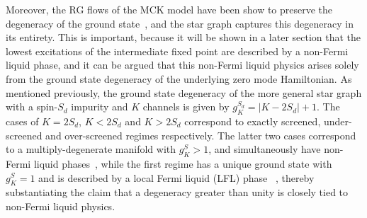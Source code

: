 \documentclass{iopart}
\begin{document}
Moreover, the RG flows of the MCK model have been show to {preserve the degeneracy of the ground state}~\cite{pang_cox_1991,kroha_kolf_2007,zitko_fabrizio_2017}, and the star graph captures this degeneracy in its entirety.
This is important, because it will be shown in a later section that the lowest excitations of the intermediate fixed point are described by a non-Fermi liquid phase, and it can be argued that this non-Fermi liquid physics arises solely from the ground state degeneracy of the underlying zero mode Hamiltonian. As mentioned previously, the ground state degeneracy of the more general star graph with a spin-\({S_d}\) impurity and \(K\) channels is given by \(g^{S_d}_K = |K - 2{S_d}|+1\).
The cases of \(K=2{S_d}\), \(K<2{S_d}\) and \(K>2{S_d}\) correspond to exactly screened, under-screened and over-screened regimes respectively. The latter two cases correspond to a multiply-degenerate manifold with \(g^S_K > 1\), and simultaneously have non-Fermi liquid phases~\cite{Noz_blandin_1980,Gan_Andrei_Coleman_1993,emery_kivelson,Gan_mchannel_1994,
Tsvelick_Weigmann_mchannel_1984,Tsvelick_weigmann_mchannel_1985,parcollet_olivier_large_N,
kimura_taro_Su_N_kondo,PhysRevB.73.224445,cox_jarrell_two_channel_rev,affleck_1991_overscreen,
Coleman_tsvelik,affleck1993exact,coleman_pepin_2003,roch_nicolas_costi_2009,schiller_avraham_2008,
Durganandini_2011}, while the first regime has a unique ground state with \(g^S_K = 1\) and is 
described by a local Fermi liquid (LFL) phase ~\cite{wilson1975,nozieres1974fermi,Noz_blandin_1980,andreiKondoreview,tsvelickKondoreview}, thereby substantiating the claim that a degeneracy greater than unity is closely tied to non-Fermi liquid physics.
\end{document}
